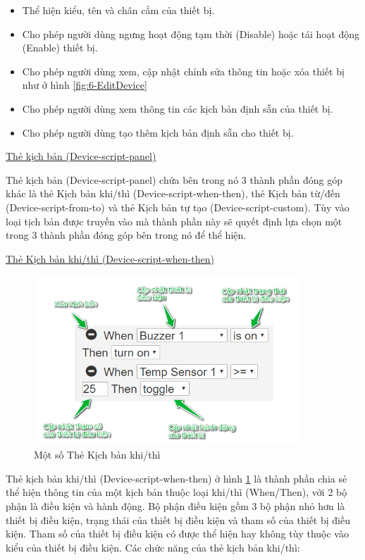 \documentclass[12pt,a4paper,oneside]{extbook}
\begin{document}
\begin{itemize}[topsep=1mm,itemsep=-0.5mm]
\item Thể hiện kiểu, tên và chân cắm của thiết bị.
\item Cho phép người dùng ngưng hoạt động tạm thời (Disable) hoặc tái hoạt động (Enable) thiết bị.
\item Cho phép người dùng xem, cập nhật chỉnh sửa thông tin hoặc xóa thiết bị như ở hình \ref{fig:6-EditDevice}
\item Cho phép người dùng xem thông tin các kịch bản định sẵn của thiết bị.
\item Cho phép người dùng tạo thêm kịch bản định sẵn cho thiết bị.
\vspace{1mm}
\end{itemize}

\noindent
\underline{Thẻ kịch bản (Device-script-panel)}

\noindent
Thẻ kịch bản (Device-script-panel) chứa bên trong nó 3 thành phần đóng góp khác là thẻ Kịch bản khi/thì (Device-script-when-then), thẻ Kịch bản từ/đến (Device-script-from-to) và thẻ Kịch bản tự tạo (Device-script-custom). Tùy vào loại tịch bản được truyền vào mà thành phần này sẽ quyết định lựa chọn một trong 3 thành phần đóng góp bên trong nó để thể hiện.

\noindent
\underline{Thẻ Kịch bản khi/thì (Device-script-when-then)}

\begin{figure}[h]
  \centering
     \includegraphics[width=10cm]{6-device-script-when-then}
  \caption{Một số Thẻ Kịch bản khi/thì}\label{fig:6-device-script-when-then}
\end{figure}

\noindent
Thẻ kịch bản khi/thì (Device-script-when-then) ở hình \ref{fig:6-device-script-when-then} là thành phần chia sẻ thể hiện thông tin của một kịch bản thuộc loại khi/thì (When/Then), với 2 bộ phận là điều kiện và hành động. Bộ phận điều kiện gồm 3 bộ phận nhỏ hơn là thiết bị điều kiện, trạng thái của thiết bị điều kiện và tham số của thiết bị điều kiện. Tham số của thiết bị điều kiện có được thể hiện hay không tùy thuộc vào kiểu của thiết bị điều kiện. Các chức năng của thẻ kịch bản khi/thì:
\end{document}
